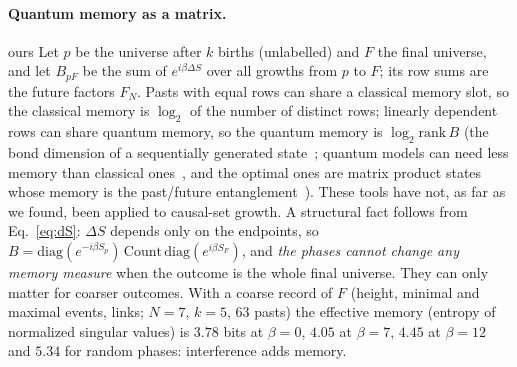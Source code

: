 \documentclass[11pt,a4paper]{article}
\newcommand{\tagbox}[2]{\textsf{\scriptsize\colorbox{#1!12}{\textcolor{#1!70!black}{#2}}}}
\newcommand{\ours}{\tagbox{orange}{ours}}
\begin{document}
\paragraph{Quantum memory as a matrix.} \ours{} Let $p$ be the universe after $k$ births (unlabelled) and $F$ the final universe, and let $B_{pF}$ be the sum of $e^{i\beta\Delta S}$ over all growths from $p$ to $F$; its row sums are the future factors $F_N$. Pasts with equal rows can share a classical memory slot, so the classical memory is $\log_2$ of the number of distinct rows; linearly dependent rows can share quantum memory, so the quantum memory is $\log_2\mathrm{rank}\,B$ (the bond dimension of a sequentially generated state~\cite{Schon05}; quantum models can need less memory than classical ones~\cite{Gu12}, and the optimal ones are matrix product states whose memory is the past/future entanglement~\cite{YBNG18}). These tools have not, as far as we found, been applied to causal-set growth. A structural fact follows from Eq.~\eqref{eq:dS}: $\Delta S$ depends only on the endpoints, so $B=\mathrm{diag}(e^{-i\beta S_p})\,\mathrm{Count}\,\mathrm{diag}(e^{i\beta S_F})$, and \emph{the phases cannot change any memory measure} when the outcome is the whole final universe. They can only matter for coarser outcomes. With a coarse record of $F$ (height, minimal and maximal events, links; $N=7$, $k=5$, 63 pasts) the effective memory (entropy of normalized singular values) is $3.78$ bits at $\beta=0$, $4.05$ at $\beta=7$, $4.45$ at $\beta=12$ and $5.34$ for random phases: interference adds memory.
\end{document}
